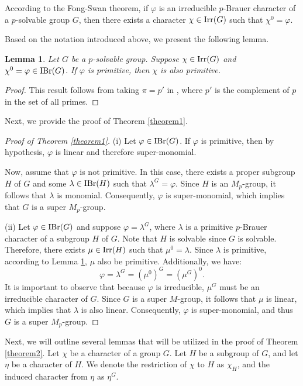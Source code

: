 \documentclass[12pt]{amsart}
\newtheorem{lem}[theorem]{Lemma}
\theoremstyle{remark}
\numberwithin{equation}{section}
\begin{document}
According to the Fong-Swan theorem, if $\varphi$ is an irreducible $p$-Brauer
character of a $p$-solvable group $G$, then there exists a character $\chi\in {\rm Irr}(G)$
such that $\chi^{0}=\varphi$.

Based on the notation introduced above, we present the following lemma.

\begin{lem}\label{lemma2.1}
Let $G$ be a $p$-solvable group.
Suppose $\chi\in {\rm Irr}(G)$ and $\chi^{0}=\varphi\in {\rm IBr}(G)$.
If $\varphi$ is primitive, then $\chi$ is also primitive.
\end{lem}

\begin{proof}
This result follows from taking $\pi=p'$ in \cite[Lemma 3.3]{LewisProc2010},
where $p'$ is the complement of $p$ in the set of all primes.
\end{proof}

Next, we provide the proof of Theorem \ref{theorem1}.

\begin{proof}[Proof of Theorem \ref{theorem1}]
(i) Let $\varphi\in {\rm IBr}(G)$. If $\varphi$ is primitive,
then by hypothesis, $\varphi$ is linear and therefore super-monomial.

Now, assume that $\varphi$ is not primitive. In this case, there exists a proper subgroup $H$ of $G$
and some $\lambda\in {\rm IBr}(H)$ such that $\lambda^{G}=\varphi$.
Since $H$ is an $M_{p}$-group, it follows that $\lambda$ is monomial.
Consequently, $\varphi$ is super-monomial, which implies that $G$ is a super $M_{p}$-group.

(ii) Let $\varphi\in {\rm IBr}(G)$ and suppose $\varphi=\lambda^{G}$,
where $\lambda$ is a primitive $p$-Brauer character of a subgroup $H$ of $G$.
Note that $H$ is solvable since $G$ is solvable. Therefore, there exists $\mu\in {\rm Irr}(H)$ such that
$\mu^{0}=\lambda$. Since $\lambda$ is primitive, according to Lemma \ref{lemma2.1}, 
$\mu$ also be primitive.
Additionally, we have:
$$\varphi=\lambda^{G}=(\mu^{0})^{G}=(\mu^{G})^{0}.$$
It is important to observe that because $\varphi$ is irreducible, $\mu^{G}$ must be an irreducible character of $G$.
Since $G$ is a super $M$-group, it follows that $\mu$ is linear, which implies that $\lambda$ is also linear.
Consequently, $\varphi$ is super-monomial, and thus $G$ is a super $M_{p}$-group.
\end{proof}

Next, we will outline several lemmas that will be utilized in the proof of Theorem \ref{theorem2}. Let $\chi$ be a character of a group $G$.
Let $H$ be a subgroup of $G$, and let $\eta$ be a character of $H$.
We denote the restriction of $\chi$ to $H$ as $\chi_H$, and the induced character from $\eta$ as $\eta^G$.
\end{document}
